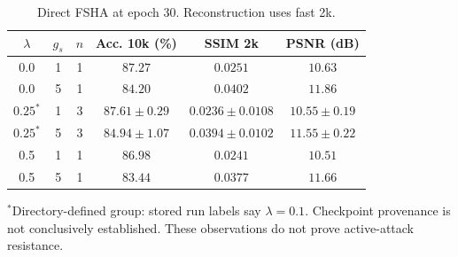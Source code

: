 \begin{table}[t]
\centering
\caption{Direct FSHA at epoch 30. Reconstruction uses fast 2k.}
\label{tab:fsha}
\footnotesize
\setlength{\tabcolsep}{4pt}
\begin{tabular}{@{}cccccc@{}}
\toprule
$\lambda$ & $g_s$ & $n$ & Acc. 10k (\%) & SSIM 2k & PSNR (dB) \\
\midrule
0.0 & 1 & 1 & $87.27$ & $0.0251$ & $10.63$ \\
0.0 & 5 & 1 & $84.20$ & $0.0402$ & $11.86$ \\
$0.25^{*}$ & 1 & 3 & $87.61\pm 0.29$ & $0.0236\pm 0.0108$ & $10.55\pm 0.19$ \\
$0.25^{*}$ & 5 & 3 & $84.94\pm 1.07$ & $0.0394\pm 0.0102$ & $11.55\pm 0.22$ \\
0.5 & 1 & 1 & $86.98$ & $0.0241$ & $10.51$ \\
0.5 & 5 & 1 & $83.44$ & $0.0377$ & $11.66$ \\
\bottomrule
\end{tabular}
\par\vspace{2pt}\begin{minipage}{\linewidth}\footnotesize $^{*}$Directory-defined group: stored run labels say $\lambda=0.1$. Checkpoint provenance is not conclusively established. These observations do not prove active-attack resistance.\end{minipage}
\end{table}
